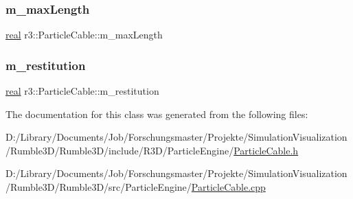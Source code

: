 \subsubsection{\texorpdfstring{m\+\_\+max\+Length}{m\_maxLength}}
{\footnotesize\ttfamily \mbox{\hyperlink{namespacer3_ab2016b3e3f743fb735afce242f0dc1eb}{real}} r3\+::\+Particle\+Cable\+::m\+\_\+max\+Length\hspace{0.3cm}{\ttfamily [protected]}}

\mbox{\label{classr3_1_1_particle_cable_ad03466bf1aeecddec5fd0319be7b2e3d}} 
\subsubsection{\texorpdfstring{m\+\_\+restitution}{m\_restitution}}
{\footnotesize\ttfamily \mbox{\hyperlink{namespacer3_ab2016b3e3f743fb735afce242f0dc1eb}{real}} r3\+::\+Particle\+Cable\+::m\+\_\+restitution\hspace{0.3cm}{\ttfamily [protected]}}



The documentation for this class was generated from the following files\+:\begin{DoxyCompactItemize}
\item 
D\+:/\+Library/\+Documents/\+Job/\+Forschungsmaster/\+Projekte/\+Simulation\+Visualization/\+Rumble3\+D/\+Rumble3\+D/include/\+R3\+D/\+Particle\+Engine/\mbox{\hyperlink{_particle_cable_8h}{Particle\+Cable.\+h}}\item 
D\+:/\+Library/\+Documents/\+Job/\+Forschungsmaster/\+Projekte/\+Simulation\+Visualization/\+Rumble3\+D/\+Rumble3\+D/src/\+Particle\+Engine/\mbox{\hyperlink{_particle_cable_8cpp}{Particle\+Cable.\+cpp}}\end{DoxyCompactItemize}
